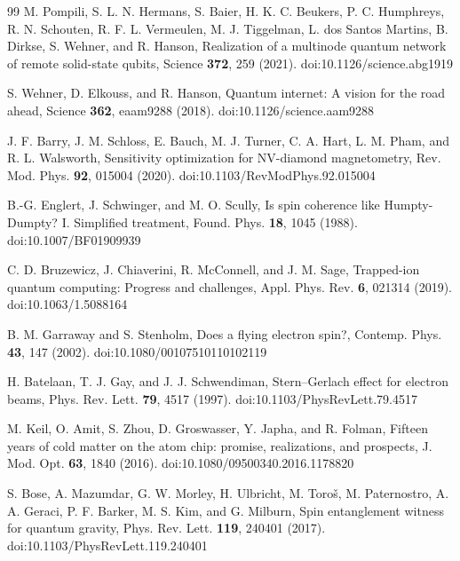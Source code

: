 \begin{thebibliography}{99}
 M. Pompili, S. L. N. Hermans, S. Baier, H. K. C. Beukers, P. C. Humphreys, R. N. Schouten, R. F. L. Vermeulen, M. J. Tiggelman, L. dos Santos Martins, B. Dirkse, S. Wehner, and R. Hanson, Realization of a multinode quantum network of remote solid-state qubits, Science \textbf{372}, 259 (2021). doi:10.1126/science.abg1919

 S. Wehner, D. Elkouss, and R. Hanson, Quantum internet: A vision for the road ahead, Science \textbf{362}, eaam9288 (2018). doi:10.1126/science.aam9288

 J. F. Barry, J. M. Schloss, E. Bauch, M. J. Turner, C. A. Hart, L. M. Pham, and R. L. Walsworth, Sensitivity optimization for NV-diamond magnetometry, Rev. Mod. Phys. \textbf{92}, 015004 (2020). doi:10.1103/RevModPhys.92.015004

 B.-G. Englert, J. Schwinger, and M. O. Scully, Is spin coherence like Humpty-Dumpty? I. Simplified treatment, Found. Phys. \textbf{18}, 1045 (1988). doi:10.1007/BF01909939

 C. D. Bruzewicz, J. Chiaverini, R. McConnell, and J. M. Sage, Trapped-ion quantum computing: Progress and challenges, Appl. Phys. Rev. \textbf{6}, 021314 (2019). doi:10.1063/1.5088164

 B. M. Garraway and S. Stenholm, Does a flying electron spin?, Contemp. Phys. \textbf{43}, 147 (2002). doi:10.1080/00107510110102119

 H. Batelaan, T. J. Gay, and J. J. Schwendiman, Stern--Gerlach effect for electron beams, Phys. Rev. Lett. \textbf{79}, 4517 (1997). doi:10.1103/PhysRevLett.79.4517

 M. Keil, O. Amit, S. Zhou, D. Groswasser, Y. Japha, and R. Folman, Fifteen years of cold matter on the atom chip: promise, realizations, and prospects, J. Mod. Opt. \textbf{63}, 1840 (2016). doi:10.1080/09500340.2016.1178820

 S. Bose, A. Mazumdar, G. W. Morley, H. Ulbricht, M. Toro\v{s}, M. Paternostro, A. A. Geraci, P. F. Barker, M. S. Kim, and G. Milburn, Spin entanglement witness for quantum gravity, Phys. Rev. Lett. \textbf{119}, 240401 (2017). doi:10.1103/PhysRevLett.119.240401
\end{thebibliography}
